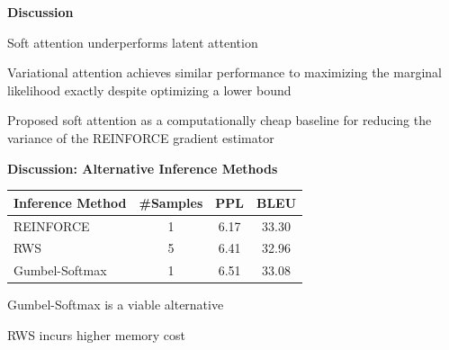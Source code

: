 \documentclass[aspectratio=169]{beamer}
\let\tempone\itemize
\let\temptwo\enditemize
\renewenvironment{itemize}{\tempone\addtolength{\itemsep}{0.5\baselineskip}}{\temptwo}
\newcommand{\thetitle}[1]{{\begin{center}\textbf{{#1}}\end{center}}}
\newcommand{\air}{\vspace{0.25cm}}
\begin{document}
\begin{frame}\thetitle{Discussion}
\begin{itemize}
    \item Soft attention underperforms
        latent attention
    \air
    \item Variational attention achieves
        similar performance to maximizing the marginal likelihood exactly
        despite optimizing a lower bound
    \air
    \item Proposed soft attention as a computationally cheap baseline for reducing the variance of the
        REINFORCE gradient estimator
\end{itemize}
\end{frame}

\begin{frame}\thetitle{Discussion: Alternative Inference Methods}
\begin{table}
\centering
\begin{tabular}{lccc}
       \toprule
    Inference Method & \#Samples & PPL & BLEU \\
    \midrule
  REINFORCE & 1 & 6.17 & 33.30 \\
  RWS & 5 & 6.41 & 32.96 \\
  Gumbel-Softmax  & 1 & 6.51 & 33.08\\
    \bottomrule
   \end{tabular}
   \end{table}
\begin{itemize}
    \item Gumbel-Softmax is a viable alternative
    \item RWS incurs higher memory cost
\end{itemize}


\end{frame}
\end{document}

